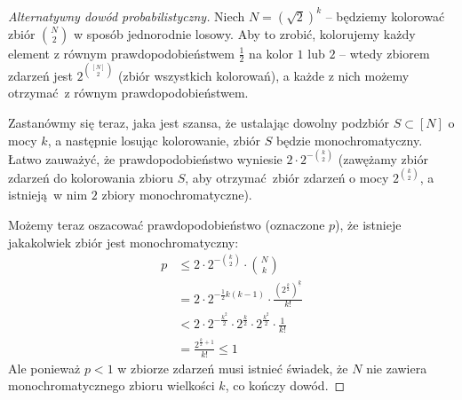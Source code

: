 \begin{proof}[Alternatywny dowód probabilistyczny]
	Niech $N = (\sqrt{2})^{k}$ -- będziemy kolorować zbiór $\binom{N}{2}$ w sposób jednorodnie losowy.
	Aby to zrobić, kolorujemy każdy element z równym prawdopodobieństwem $\frac{1}{2}$ na kolor $1$ lub $2$ -- wtedy zbiorem zdarzeń
	jest $2^{\binom{[N]}{2}}$ (zbiór wszystkich kolorowań), a każde z nich możemy otrzymać z równym prawdopodobieństwem.

	Zastanówmy się teraz, jaka jest szansa, że ustalając dowolny podzbiór $S \subset [N]$ o mocy $k$, a następnie losując kolorowanie,
	zbiór $S$ będzie monochromatyczny. Łatwo zauważyć, że prawdopodobieństwo wyniesie $2 \cdot 2^{-\binom{k}{2}}$ (zawężamy zbiór zdarzeń do kolorowania zbioru $S$, aby
	otrzymać zbiór zdarzeń o mocy $2^{\binom{k}{2}}$, a istnieją w nim $2$ zbiory monochromatyczne).

	Możemy teraz oszacować prawdopodobieństwo (oznaczone $p$), że istnieje jakakolwiek zbiór jest monochromatyczny:
	\begin{align*}
		p & \leq 2 \cdot 2^{-\binom{k}{2}} \cdot \binom{N}{k}                                             \\
		  & = 2 \cdot 2^{-\frac{1}{2}k(k-1)} \cdot \frac{{(2^{\frac{k}{2}})}^{\underline{k}}}{k!}         \\
		  & < 2 \cdot 2^{-\frac{k^2}{2}} \cdot 2^{\frac{k}{2}} \cdot 2^{\frac{k^2}{2}} \cdot \frac{1}{k!} \\
		  & = \frac{2^{\frac{k}{2}+1}}{k!} \leq 1
	\end{align*}
	Ale ponieważ $p < 1$ w zbiorze zdarzeń musi istnieć świadek, że
	$N$ nie zawiera monochromatycznego zbioru wielkości $k$, co kończy dowód.
\end{proof}
